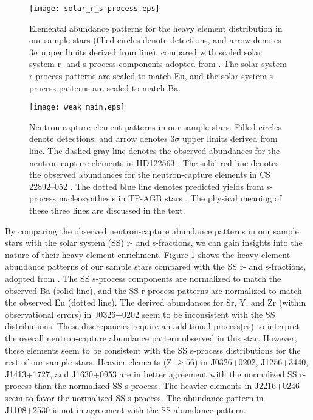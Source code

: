 \begin{figure}[!ht]
\centering
\texttt{[image: solar\_r\_s-process.eps]} 
\caption{Elemental abundance patterns for the heavy element distribution in our
sample stars (filled circles denote detections, and arrow denotes $3 \sigma$
upper limits derived from  line), compared with scaled solar system
r- and s-process components adopted from \citet{2000ApJ...544..302B}. The solar
system r-process patterns are scaled to match Eu, and the solar system s-process
patterns are scaled to match Ba.}
\label{fig:solar_r_s-process}
\end{figure}



\begin{figure}[!ht]
\centering
\texttt{[image: weak\_main.eps]} 
\caption{Neutron-capture element patterns in our sample stars. Filled circles
denote detections, and arrow denotes $3 \sigma$ upper limits derived from
 line. The dashed gray line denotes the observed abundances for the
neutron-capture elements in HD122563 \citep{2006ApJ...643.1180H,
2012ApJS..203...27R}. The solid red line denotes the observed abundances for the
neutron-capture elements in CS 22892–052 \citep{2003ApJ...591..936S,
2009ApJS..182...80S, 2009ApJ...698.1963R}. The dotted blue line denotes
predicted yields from s-process nucleosynthesis in TP-AGB stars
\citep{2008ARA&A..46..241S, 2011MNRAS.418..284B}. The physical meaning of these
three lines are discussed in the text.}
\label{fig:weak_main}
\end{figure}

By comparing the observed neutron-capture abundance patterns in our sample
stars with the solar system (SS) r- and s-fractions, we can gain insights into
the nature of their heavy element enrichment. Figure \ref{fig:solar_r_s-process} shows the
heavy element abundance patterns of our sample stars compared with the SS r- and
s-fractions, adopted from \citet{2000ApJ...544..302B}. The SS s-process
components are normalized to match the observed Ba (solid line), and the SS
r-process patterns are normalized to match the observed Eu (dotted line). The
derived abundances for Sr, Y, and Zr (within observational errors) in J0326+0202
seem to be inconsistent with the SS distributions. These discrepancies require
an additional process(es) to interpret the overall neutron-capture abundance
pattern observed in this star. However, these elements seem to be consistent
with the SS s-process distributions for the rest of our sample stars. Heavier
elements (Z $\geqslant 56$) in J0326+0202, J1256+3440,  J1413+1727, and
J1630+0953 are in better agreement with the normalized SS r-process than the
normalized SS s-process. The heavier elements in J2216+0246 seem to favor the
normalized SS s-process. The abundance pattern in J1108+2530 is not in agreement
with the SS abundance pattern.

